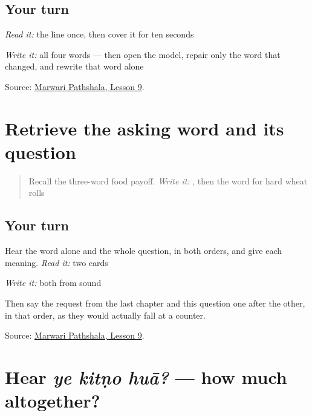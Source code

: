 \subsection*{Your turn}
\emph{Read it:} the line once, then cover it for ten seconds

\emph{Write it:} all four words — then open the model, repair only the word that changed, and rewrite that word alone

\begin{tcolorbox}[breakable,colback=teal!4,colframe=teal!35!black,title={Before you move on}]
Source: \href{https://www.marwaripathshala.com/marwari-lesson-9-english}{Marwari Pathshala, Lesson 9}.
\end{tcolorbox}
\section[Practice]{Retrieve the asking word and its question}

\label{lesson:MW-R22-price-two}



\begin{quote}
Recall the three-word food payoff. \emph{Write it:} \textbf{}, then the word for hard wheat rolls
\end{quote}

\subsection*{Your turn}
Hear the word alone and the whole question, in both orders, and give each meaning. \emph{Read it:} two cards

\emph{Write it:} both from sound

Then say the request from the last chapter and this question one after the other, in that order, as they would actually fall at a counter.

\begin{tcolorbox}[breakable,colback=teal!4,colframe=teal!35!black,title={Before you move on}]
Source: \href{https://www.marwaripathshala.com/marwari-lesson-9-english}{Marwari Pathshala, Lesson 9}.
\end{tcolorbox}
\section[ye kitṇo huā?]{Hear \emph{ye kitṇo huā?} — how much altogether?}

\label{lesson:MW-C22-hear-total-question}



